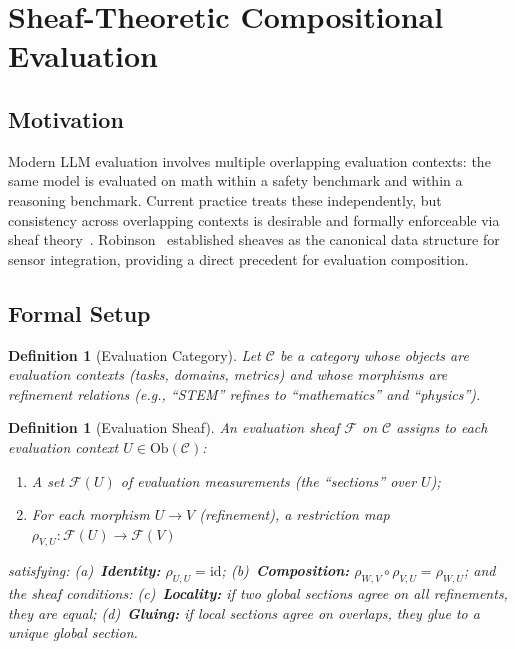 \documentclass[11pt]{article}
\newtheorem{definition}[theorem]{Definition}
\newcommand{\cF}{\mathcal{F}}
\newcommand{\cC}{\mathcal{C}}
\begin{document}
\section{Sheaf-Theoretic Compositional Evaluation}
\label{sec:sheaf}

\subsection{Motivation}

Modern LLM evaluation involves multiple overlapping evaluation contexts: the same model is evaluated on math within a safety benchmark and within a reasoning benchmark. Current practice treats these independently, but consistency across overlapping contexts is desirable and formally enforceable via sheaf theory~\cite{bredon1997sheaf,curry2014sheaves}. Robinson~\cite{robinson2014topological,robinson2017sheaves} established sheaves as the canonical data structure for sensor integration, providing a direct precedent for evaluation composition.

\subsection{Formal Setup}

\begin{definition}[Evaluation Category]
Let $\cC$ be a category whose objects are evaluation contexts (tasks, domains, metrics) and whose morphisms are refinement relations (e.g., ``STEM'' refines to ``mathematics'' and ``physics'').
\end{definition}

\begin{definition}[Evaluation Sheaf]
An \emph{evaluation sheaf} $\cF$ on $\cC$ assigns to each evaluation context $U \in \mathrm{Ob}(\cC)$:
\begin{enumerate}
\item A set $\cF(U)$ of evaluation measurements (the ``sections'' over $U$);
\item For each morphism $U \to V$ (refinement), a restriction map $\rho_{V,U}: \cF(U) \to \cF(V)$
\end{enumerate}
satisfying: (a)~\textbf{Identity:} $\rho_{U,U} = \mathrm{id}$; (b)~\textbf{Composition:} $\rho_{W,V} \circ \rho_{V,U} = \rho_{W,U}$; and the sheaf conditions: (c)~\textbf{Locality:} if two global sections agree on all refinements, they are equal; (d)~\textbf{Gluing:} if local sections agree on overlaps, they glue to a unique global section.
\end{definition}
\end{document}
